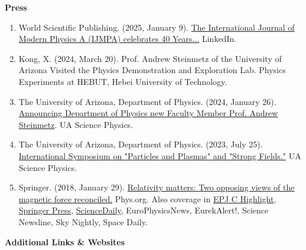 \documentclass[11pt]{article}
\begin{document}
\medskip

{\Large\textbf{Press}}

\begin{enumerate}[leftmargin=*,nosep]
    \item World Scientific Publishing. (2025, January 9). \href{https://www.linkedin.com/embed/feed/update/urn:li:share:7282593891487293440}{The International Journal of Modern Physics A (IJMPA) celebrates 40 Years...} LinkedIn.
    \item Kong, X. (2024, March 20). Prof. Andrew Steinmetz of the University of Arizona Visited the Physics Demonstration and Exploration Lab. Physics Experiments at HEBUT, Hebei University of Technology.
    \item The University of Arizona, Department of Physics. (2024, January 26). \href{https://w3.physics.arizona.edu/news/announcing-department-physics-new-faculty-member-prof-andrew-steinmetz}{Announcing Department of Physics new Faculty Member Prof. Andrew Steinmetz}. UA Science Physics.
    \item The University of Arizona, Department of Physics. (2023, July 25). \href{https://w3.physics.arizona.edu/news/international-symposium-particles-and-plasmas-and-strong-fields}{International Symposium on "Particles and Plasmas" and "Strong Fields."} UA Science Physics.
    \item Springer. (2018, January 29). \href{https://phys.org/news/2018-01-relativity-opposing-views-magnetic.html}{Relativity matters: Two opposing views of the magnetic force reconciled.} Phys.org. Also coverage in \href{https://www.epj.org/epjc-news/1422-epjc-highlight-relativity-matters-two-opposing-views-of-the-magnetic-force-reconciled}{EPJ C Highlight}, \href{https://www.springer.com/gp/about-springer/media/research-news/all-english-research-news/relativity-matters--two-opposing-views-of-the-magnetic-force-reconciled/15417658}{Springer Press}, \href{https://www.sciencedaily.com/releases/2018/01/180129131327.htm}{ScienceDaily}, EuroPhysicsNews, EurekAlert!, Science Newsline, Sky Nightly, Space Daily.
\end{enumerate}

\medskip

{\Large\textbf{Additional Links \& Websites}}
\end{document}
